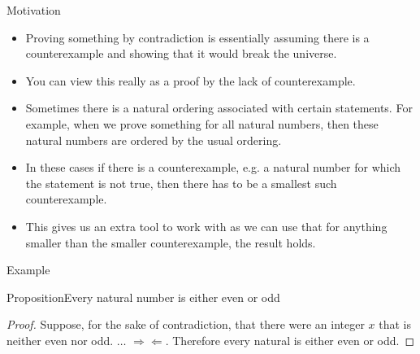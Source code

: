 \documentclass{beamer}
\def\bl[#1]#2{\begin{block}{#1}#2\end{block}}
\def\itemb{\begin{itemize}}
\def\iteme{\end{itemize}}
\begin{document}
\begin{frame}{Motivation}
\itemb
\item Proving something by contradiction is essentially assuming there is a counterexample and showing that it would break the universe.
\item You can view this really as a proof by the lack of counterexample.

\item Sometimes there is a natural ordering associated with certain statements. For example, when we prove something for all natural numbers, then these natural numbers are ordered by the usual ordering. 
\item In these cases if there is a counterexample, e.g. a natural number for which the statement is not true, then there has to be a smallest such counterexample.
\item This gives us an extra tool to work with as we can use that for anything smaller than the smaller counterexample, the result holds.
\iteme
\end{frame}

\begin{frame}{Example}
\bl[Proposition]{Every natural number is either even or odd}

\begin{proof}
Suppose, for the sake of contradiction, that there were an integer $x$ that is neither even nor odd. \color{blue}\color{black} $\dots$ $\Rightarrow\Leftarrow$. Therefore every natural is either even or odd.
\end{proof}
\end{frame}
\end{document}
